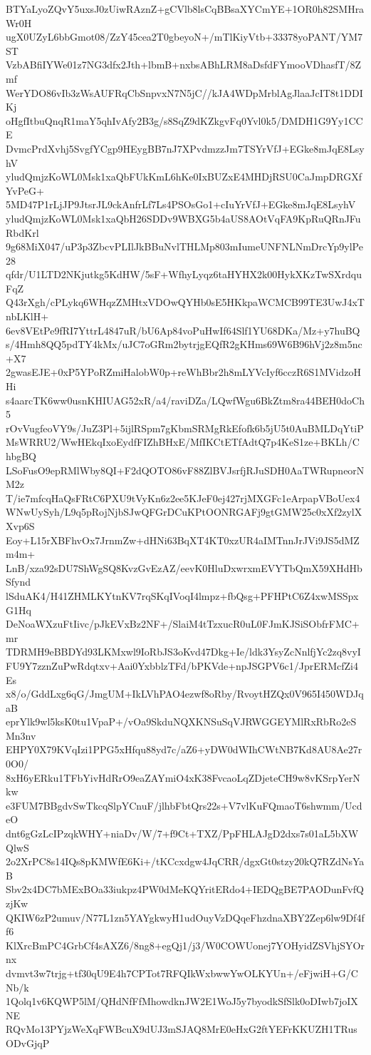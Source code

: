 BTYaLyoZQvY5uxsJ0zUiwRAznZ+gCVlb8lsCqBBsaXYCmYE+1OR0h82SMHraWr0H
ugX0UZyL6bbGmot08/ZzY45cea2T0gbeyoN+/mTlKiyVtb+33378yoPANT/YM7ST
VzbABfiIYWe01z7NG3dfx2Jth+lbmB+nxbsABhLRM8aDsfdFYmooVDhasfT/8Zmf
WerYDO86vIb3zWsAUFRqCbSnpvxN7N5jC//kJA4WDpMrblAgJlaaJcIT8t1DDIKj
oHgfItbuQnqR1maY5qhIvAfy2B3g/s8SqZ9dKZkgvFq0Yvl0k5/DMDH1G9Yy1CCE
DvmcPrdXvhj5SvgfYCgp9HEygBB7nJ7XPvdmzzJm7TSYrVfJ+EGke8mJqE8LsyhV
yludQmjzKoWL0Msk1xaQbFUkKmL6hKe0IxBUZxE4MHDjRSU0CaJmpDRGXfYvPeG+
5MD47P1rLjJP9JtsrJL9ckAnfrLf7Ls4PSOsGo1+cIuYrVfJ+EGke8mJqE8LsyhV
yludQmjzKoWL0Msk1xaQbH26SDDv9WBXG5b4aUS8AOtVqFA9KpRuQRnJFuRbdKrl
9g68MiX047/uP3p3ZbcvPLIlJkBBuNvlTHLMp803mIumeUNFNLNmDrcYp9ylPe28
qfdr/U1LTD2NKjutkg5KdHW/5sF+WfhyLyqz6taHYHX2k00HykXKzTwSXrdquFqZ
Q43rXgh/cPLykq6WHqzZMHtxVDOwQYHb0sE5HKkpaWCMCB99TE3UwJ4xTnbLKlH+
6ev8VEtPe9fRI7YttrL4847uR/bU6Ap84voPuHwIf64Slf1YU68DKa/Mz+y7huBQ
s/4Hmh8QQ5pdTY4kMx/uJC7oGRm2bytrjgEQfR2gKHms69W6B96hVj2z8m5nc+X7
2gwasEJE+0xP5YPoRZmiHalobW0p+reWhBbr2h8mLYVcIyf6cczR6S1MVidzoHHi
s4aarcTK6ww0usnKHIUAG52xR/a4/raviDZa/LQwfWgu6BkZtm8ra44BEH0doCh5
rOvVugfeoVY9s/JuZ3Pl+5ijlRSpm7gKbmSRMgRkEfofk6b5jU5t0AuBMLDqYtiP
MsWRRU2/WwHEkqIxoEydfFIZhBHxE/MfIKCtETfAdtQ7p4KeS1ze+BKLh/ChbgBQ
LSoFusO9epRMlWby8QI+F2dQOTO86vF88ZlBVJsrfjRJuSDH0AaTWRupneorNM2z
T/ie7mfcqHaQsFRtC6PXU9tVyKn6z2ee5KJeF0ej427rjMXGFc1eArpapVBoUex4
WNwUySyh/L9q5pRojNjbSJwQFGrDCuKPtOONRGAFj9gtGMW25c0xXf2zylXXvp6S
Eoy+L15rXBFhvOx7JrnmZw+dHNi63BqXT4KT0xzUR4aIMTnnJrJVi9JS5dMZm4m+
LnB/xza92sDU7ShWgSQ8KvzGvEzAZ/eevK0HluDxwrxmEVYTbQmX59XHdHbSfynd
lSduAK4/H41ZHMLKYtnKV7rqSKqIVoqI4lmpz+fbQsg+PFHPtC6Z4xwMSSpxG1Hq
DeNoaWXzuFtIivc/pJkEVxBz2NF+/SlaiM4tTzxucR0uL0FJmKJSiSObfrFMC+mr
TDRMH9eBBDYd93LKMxwl9IoRbJS3oKvd47Dkg+Ie/ldk3YsyZcNnlfjYc2zq8vyI
FU9Y7zznZuPwRdqtxv+Aai0YxbblzTFd/bPKVde+npJSGPV6c1/JprERMcfZi4Es
x8/o/GddLxg6qG/JmgUM+IkLVhPAO4ezwf8oRby/RvoytHZQx0V965I450WDJqaB
eprYlk9wl5ksK0tu1VpaP+/vOa9SkduNQXKNSuSqVJRWGGEYMlRxRbRo2eSMn3nv
EHPY0X79KVqIzi1PPG5xHfqu88yd7c/aZ6+yDW0dWIhCWtNB7Kd8AU8Ae27r0O0/
8xH6yERku1TFbYivHdRrO9eaZAYmiO4xK38FvcaoLqZDjeteCH9w8vKSrpYerNkw
e3FUM7BBgdvSwTkcqSlpYCnuF/jlhbFbtQrs22s+V7vlKuFQmaoT6shwmm/UcdeO
dnt6gGzLcIPzqkWHY+niaDv/W/7+f9Ct+TXZ/PpFHLAJgD2dxs7s01aL5bXWQlwS
2o2XrPC8s14IQs8pKMWfE6Ki+/tKCcxdgw4JqCRR/dgxGt0stzy20kQ7RZdNsYaB
Sbv2x4DC7bMExBOa33iukpz4PW0dMeKQYritERdo4+IEDQgBE7PAODunFvfQzjKw
QKIW6zP2umuv/N77L1zn5YAYgkwyH1udOuyVzDQqeFhzdnaXBY2Zep6lw9Df4ff6
KlXrcBmPC4GrbCf4sAXZ6/8ng8+egQj1/j3/W0COWUonej7YOHyidZSVhjSYOrnx
dvmvt3w7trjg+tf30qU9E4h7CPTot7RFQIkWxbwwYwOLKYUn+/eFjwiH+G/CNb/k
1Qolq1v6KQWP5lM/QHdNfFfMhowdknJW2E1WoJ5y7byodkSfSlk0oDIwb7joIXNE
RQvMo13PYjzWeXqFWBcuX9dUJ3mSJAQ8MrE0eHxG2ftYEFrKKUZH1TRusODvGjqP
